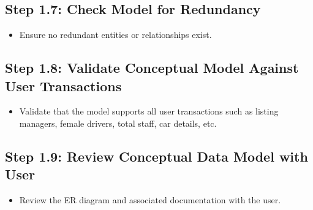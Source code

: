 \documentclass[a4paper,12pt]{article}
\begin{document}
\subsection*{Step 1.7: Check Model for Redundancy}
\begin{itemize}
    \item Ensure no redundant entities or relationships exist.
\end{itemize}

\subsection*{Step 1.8: Validate Conceptual Model Against User Transactions}
\begin{itemize}
    \item Validate that the model supports all user transactions such as listing managers, female drivers, total staff, car details, etc.
\end{itemize}

\subsection*{Step 1.9: Review Conceptual Data Model with User}
\begin{itemize}
    \item Review the ER diagram and associated documentation with the user.
\end{itemize}
\end{document}
